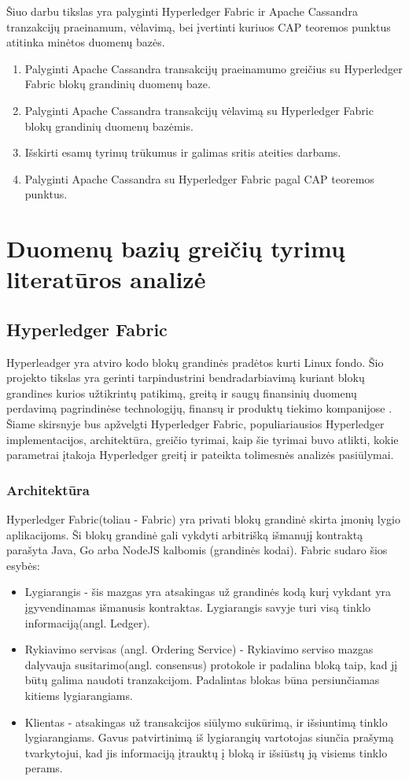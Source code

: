 \documentclass{VUMIFPSkursinis}
\begin{document}
	 Šiuo darbu tikslas yra palyginti Hyperledger Fabric ir Apache Cassandra tranzakcijų praeinamum, vėlavimą, bei įvertinti kuriuos CAP teoremos punktus atitinka minėtos duomenų bazės.

	\begin{enumerate}
		\item{Palyginti Apache Cassandra transakcijų praeinamumo greičius su Hyperledger Fabric blokų grandinių duomenų baze.}
		\item{Palyginti Apache Cassandra transakcijų vėlavimą su Hyperledger Fabric blokų grandinių duomenų bazėmis.}
		\item{Išskirti esamų tyrimų trūkumus ir galimas sritis ateities darbams.}
		\item{Palyginti Apache Cassandra su Hyperledger Fabric pagal CAP teoremos punktus.}
		
	\end{enumerate}
\pagebreak
\section{Duomenų bazių greičių tyrimų literatūros analizė}
	\subsection{Hyperledger Fabric}
		Hyperleadger yra atviro kodo blokų grandinės pradėtos kurti Linux fondo. Šio projekto tikslas yra gerinti tarpindustrini bendradarbiavimą kuriant blokų grandines kurios užtikrintų 
		patikimą, greitą ir saugų finansinių duomenų perdavimą pagrindinėse technologijų, finansų ir produktų tiekimo kompanijose \cite{LinuxHyper}. Šiame skirsnyje bus apžvelgti 
		Hyperledger Fabric, populiariausios Hyperledger implementacijos, architektūra, greičio tyrimai, kaip šie tyrimai buvo atlikti, kokie parametrai įtakoja Hyperledger greitį ir pateikta tolimesnės analizės pasiūlymai. 
		\subsubsection{Architektūra}
			Hyperledger Fabric(toliau - Fabric) yra privati blokų grandinė skirta įmonių lygio aplikacijoms. 
			Ši blokų grandinė gali vykdyti arbitrišką išmanujį kontraktą parašyta Java, Go arba NodeJS kalbomis (grandinės kodai).
			Fabric sudaro šios esybės:
			\begin{itemize}
				\item{Lygiarangis - šis mazgas yra atsakingas už grandinės kodą kurį vykdant yra įgyvendinamas išmanusis kontraktas. 
 Lygiarangis savyje turi visą tinklo informaciją(angl. Ledger). }
				\item{Rykiavimo servisas (angl. Ordering Service) - Rykiavimo serviso mazgas dalyvauja susitarimo(angl. consensus) 
protokole ir padalina bloką taip, kad jį būtų galima naudoti tranzakcijom. Padalintas blokas būna persiunčiamas kitiems lygiarangiams.}
				\item{Klientas - atsakingas už transakcijos siūlymo sukūrimą, ir išsiuntimą tinklo lygiarangiams. Gavus patvirtinimą iš lygiarangių vartotojas siunčia prašymą tvarkytojui, kad jis informaciją įtrauktų į bloką ir išsiūstų ją visiems tinklo perams.}
			\end{itemize}
\end{document}
